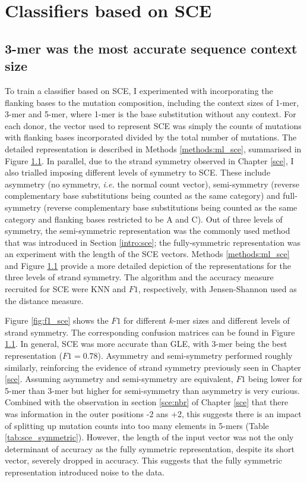 

\section{Classifiers based on SCE}\label{ml:sce}

\subsection{3-mer was the most accurate sequence context size}
To train a classifier based on SCE, I experimented with incorporating the flanking bases to the mutation composition, including the context sizes of 1-mer, 3-mer and 5-mer, where 1-mer is the base substitution without any context. For each donor, the vector used to represent SCE was simply the counts of mutations with flanking bases incorporated divided by the total number of mutations. The detailed representation is described in Methods \ref{methods:ml_sce}, summarised in Figure \ref{}. In parallel, due to the strand symmetry observed in Chapter \ref{sce}, I also trialled imposing different levels of symmetry to SCE. These include asymmetry (no symmetry, \textit{i.e.} the normal count vector), semi-symmetry (reverse complementary base substitutions being counted as the same category) and full-symmetry (reverse complementary base substitutions being counted as the same category and flanking bases restricted to be A and C). Out of three levels of symmetry, the semi-symmetric representation was the commonly used method that was introduced in Section \ref{intro:sce}; the fully-symmetric representation was an experiment with the length of the SCE vectors. Methods \ref{methods:ml_sce} and Figure \ref{} provide a more detailed depiction of the representations for the three levels of strand symmetry. The algorithm and the accuracy measure recruited for SCE were KNN and $F1$, respectively, with Jensen-Shannon used as the distance measure. 

Figure \ref{fig:f1_sce} shows the $F1$ for different $k$-mer sizes and different levels of strand symmetry. The corresponding confusion matrices can be found in Figure \ref{}. In general, SCE was more accurate than GLE, with 3-mer being the best representation ($F1=0.78$). Asymmetry and semi-symmetry performed roughly similarly, reinforcing the evidence of strand symmetry previously seen in Chapter \ref{sce}. Assuming asymmetry and semi-symmetry are equivalent, $F1$ being lower for 5-mer than 3-mer but higher for semi-symmetry than asymmetry is very curious. Combined with the observation in section \ref{sce:nbr} of Chapter \ref{sce} that there was information in the outer positions -2 ans +2, this suggests there is an impact of splitting up mutation counts into too many elements in 5-mers (Table \ref{tab:sce_symmetric}). However, the length of the input vector was not the only determinant of accuracy as the fully symmetric representation, despite its short vector, severely dropped in accuracy. This suggests that the fully symmetric representation introduced noise to the data.


